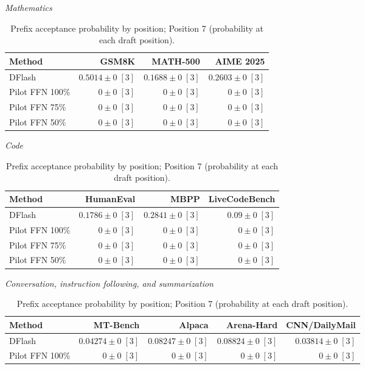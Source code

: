 \documentclass[conference,onecolumn]{IEEEtran}
\begin{document}
\begin{table}[!htp]
\centering\small
\setlength{\tabcolsep}{3pt}
\caption{Prefix acceptance probability by position; Position 7 (probability at each draft position).}
\label{tab:appendix-metric-prefix-survival-7}
\textit{Mathematics}\par\smallskip
\begin{tabular}{@{}>{\raggedright\arraybackslash}p{3.7cm}rrr@{}}
\toprule
Method & GSM8K & MATH-500 & AIME 2025 \\
\midrule
DFlash & \(\mathbf{0.5014} \pm 0\;[3]\) & \(\mathbf{0.1688} \pm 0\;[3]\) & \(\mathbf{0.2603} \pm 0\;[3]\) \\
Pilot FFN 100\% & \(0 \pm 0\;[3]\) & \(0 \pm 0\;[3]\) & \(0 \pm 0\;[3]\) \\
Pilot FFN 75\% & \(0 \pm 0\;[3]\) & \(0 \pm 0\;[3]\) & \(0 \pm 0\;[3]\) \\
Pilot FFN 50\% & \(0 \pm 0\;[3]\) & \(0 \pm 0\;[3]\) & \(0 \pm 0\;[3]\) \\
\bottomrule
\end{tabular}\par\medskip
\textit{Code}\par\smallskip
\begin{tabular}{@{}>{\raggedright\arraybackslash}p{3.7cm}rrr@{}}
\toprule
Method & HumanEval & MBPP & LiveCodeBench \\
\midrule
DFlash & \(\mathbf{0.1786} \pm 0\;[3]\) & \(\mathbf{0.2841} \pm 0\;[3]\) & \(\mathbf{0.09} \pm 0\;[3]\) \\
Pilot FFN 100\% & \(0 \pm 0\;[3]\) & \(0 \pm 0\;[3]\) & \(0 \pm 0\;[3]\) \\
Pilot FFN 75\% & \(0 \pm 0\;[3]\) & \(0 \pm 0\;[3]\) & \(0 \pm 0\;[3]\) \\
Pilot FFN 50\% & \(0 \pm 0\;[3]\) & \(0 \pm 0\;[3]\) & \(0 \pm 0\;[3]\) \\
\bottomrule
\end{tabular}\par\medskip
\textit{Conversation, instruction following, and summarization}\par\smallskip
\begin{tabular}{@{}>{\raggedright\arraybackslash}p{3.7cm}rrrr@{}}
\toprule
Method & MT-Bench & Alpaca & Arena-Hard & CNN/DailyMail \\
\midrule
DFlash & \(\mathbf{0.04274} \pm 0\;[3]\) & \(\mathbf{0.08247} \pm 0\;[3]\) & \(\mathbf{0.08824} \pm 0\;[3]\) & \(\mathbf{0.03814} \pm 0\;[3]\) \\
Pilot FFN 100\% & \(0 \pm 0\;[3]\) & \(0 \pm 0\;[3]\) & \(0 \pm 0\;[3]\) & \(0 \pm 0\;[3]\) \\

\end{tabular}
\end{table}
\end{document}
